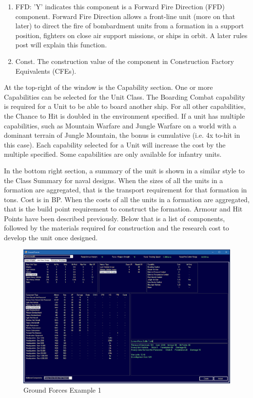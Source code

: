 \documentclass[../Aurora C# unofficial manual.tex]{subfiles}
\begin{document}
\begin{enumerate}
		\item FFD: 'Y' indicates this component is a Forward Fire Direction (FFD) component. Forward Fire Direction allows a front-line unit (more on that later) to direct the fire of bombardment units from a formation in a support position, fighters on close air support missions, or ships in orbit. A later rules post will explain this function.
		\item Const. The construction value of the component in Construction Factory Equivalents (CFEs).
	\end{enumerate}

	At the top-right of the window is the Capability section. One or more Capabilities can be selected for the Unit Class. The Boarding Combat capability is required for a Unit to be able to board another ship. For all other capabilities, the Chance to Hit is doubled in the environment specified. If a unit has multiple capabilities, such as Mountain Warfare and Jungle Warfare on a world with a dominant terrain of Jungle Mountain, the bonus is cumulative (i.e. 4x to-hit in this case). Each capability selected for a Unit will increase the cost by the multiple specified. Some capabilities are only available for infantry units.
	
	In the bottom right section, a summary of the unit is shown in a similar style to the Class Summary for naval designs. When the sizes of all the units in a formation are aggregated, that is the transport requirement for that formation in tons. Cost is in BP. When the costs of all the units in a formation are aggregated, that is the build point requirement to construct the formation. Armour and Hit Points have been described previously. Below that is a list of components, followed by the materials required for construction and the research cost to develop the unit once designed.
	\begin{figure}[H]
		\centering
		\includegraphics[width=0.9\linewidth]{images/GroundForces}
		\caption[Ground Forces]{Ground Forces Example 1}
		\label{fig:groundforces}
	\end{figure}
\end{document}
